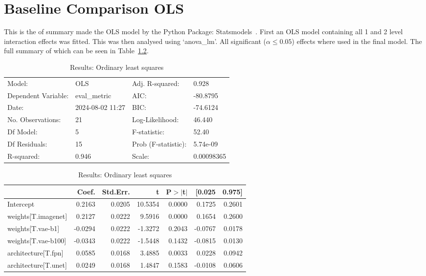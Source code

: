 \chapter{Baseline Comparison OLS}
\label{appendix:baselines_comparison_full}
This is the of summary made the OLS model by the Python Package: Statsmodels~\cite{josef_perktold_2024_10984387}. First an OLS model containing all 1 and 2 level interaction effects was fitted. This was then analysed using `anova\_lm'. All significant ($\alpha\le0.05$) effects where used in the final model. The full summary of which can be seen in Table~\ref{tab:comparison_baselines_full_ols}.

\begin{table}[ht]
\caption{Results: Ordinary least squares}
\label{tab:comparison_baselines_full_ols}
\begin{center}
\begin{tabular}{llll}
\hline
Model:              & OLS              & Adj. R-squared:     & 0.928       \\
Dependent Variable: & eval\_metric     & AIC:                & -80.8795    \\
Date:               & 2024-08-02 11:27 & BIC:                & -74.6124    \\
No. Observations:   & 21               & Log-Likelihood:     & 46.440      \\
Df Model:           & 5                & F-statistic:        & 52.40       \\
Df Residuals:       & 15               & Prob (F-statistic): & 5.74e-09    \\
R-squared:          & 0.946            & Scale:              & 0.00098365  \\
\hline
\end{tabular}
\end{center}

\begin{center}
\begin{tabular}{lrrrrrr}
\hline
                     &   Coef. & Std.Err. &       t & P$> |$t$|$ &  [0.025 & 0.975]  \\
\hline
Intercept            &  0.2163 &   0.0205 & 10.5354 &      0.0000 &  0.1725 & 0.2601  \\
weights[T.imagenet]  &  0.2127 &   0.0222 &  9.5916 &      0.0000 &  0.1654 & 0.2600  \\
weights[T.vae-b1]    & -0.0294 &   0.0222 & -1.3272 &      0.2043 & -0.0767 & 0.0178  \\
weights[T.vae-b100]  & -0.0343 &   0.0222 & -1.5448 &      0.1432 & -0.0815 & 0.0130  \\
architecture[T.fpn]  &  0.0585 &   0.0168 &  3.4885 &      0.0033 &  0.0228 & 0.0942  \\
architecture[T.unet] &  0.0249 &   0.0168 &  1.4847 &      0.1583 & -0.0108 & 0.0606  \\
\hline
\end{tabular}
\end{center}


\end{table}
